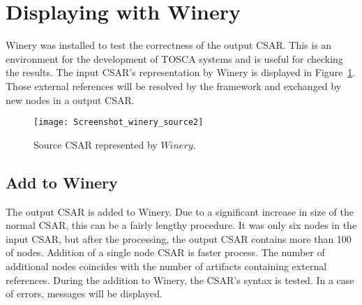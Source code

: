 \section{Displaying with Winery}\label{sec:checkwin}
Winery was installed to test the correctness of the output CSAR. 
 This is an environment for the development of TOSCA systems and is useful for checking the results. %
 The input CSAR's representation by Winery is displayed in Figure~\ref{fig:winery_source2}.
 Those external references will be resolved by the framework and exchanged by new nodes in a output CSAR. 
 \begin{figure}[ht]   
 	\centering
 	\texttt{[image: Screenshot\_winery\_source2]}
 	\caption{Source CSAR represented by $Winery$.}
 	\label{fig:winery_source2}
 \end{figure}
   
 \subsection*{Add to Winery}
 The output CSAR is added to Winery.
 Due to a significant increase in size of the normal CSAR, this can be a fairly lengthy procedure.
 It was only six nodes in the input CSAR, but after the processing, the output CSAR contains more than 100 of nodes.
 Addition of a single node CSAR is faster process.
 The number of additional nodes coincides with the number of artifacts containing external references.
 During the addition to Winery, the CSAR's syntax is tested.
 In a case of errors, messages will be displayed.
 
